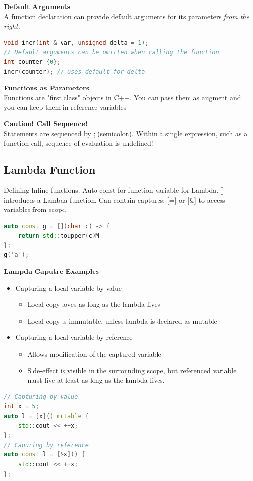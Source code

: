 \textbf{Default Arguments} \\
A function declaration can provide default arguments for its parameters \textit{from the right.}
\begin{lstlisting}[language=C++]
void incr(int & var, unsigned delta = 1);
// Default arguments can be omitted when calling the function
int counter {0};
incr(counter); // uses default for delta
\end{lstlisting}

\textbf{Functions as Parameters} \\
Functions are "first class" objects in C++. You can pass them as augment and you can keep them in reference variables.

\textbf{Caution! Call Sequence!} \\
Statements are sequenced by ; (semicolon). Within a single expression, such as a function call, sequence of evaluation is undefined!

\subsection{Lambda Function}
Defining Inline functions. Auto const for function variable for Lambda. [] introduces a Lambda function. Can contain captures: [=] or [\&] to access variables from scope.
\begin{lstlisting}[language=C++]
auto const g = [](char c) -> {
	return std::toupper(c)M
};
g('a');
\end{lstlisting}

\textbf{Lampda Caputre Examples}
\begin{itemize}
  \itemsep -0.5em 
  \item Capturing a local variable by value
  \begin{itemize}
  	\item Local copy loves as long as the lambda lives
  	\item Local copy is immutable, unless lambda is declared as mutable
  \end{itemize}
  \item Capturing a local variable by reference
  \begin{itemize}
  	\item Allows modification of the captured variable
  	\item Side-effect is visible in the surrounding scope, but referenced variable must live at least as long as the lambda lives.
  \end{itemize}
\end{itemize}
\begin{lstlisting}[language=C++]
// Capturing by value
int x = 5;
auto l = [x]() mutable {
	std::cout << ++x;
};
// Capuring by reference
auto const l = [&x]() {
	std::cout << ++x;
};
\end{lstlisting}

